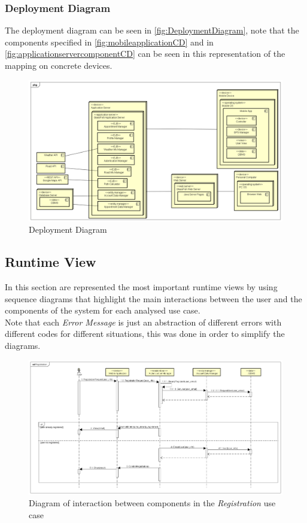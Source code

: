 \begin{samepage}
\subsubsection{Deployment Diagram}
The deployment diagram can be seen in \autoref{fig:DeploymentDiagram}, note that the components specified in \autoref{fig:mobileapplicationCD} and in \autoref{fig:applicationservercomponentCD} can be seen in this representation of the mapping on concrete devices.
\begin{figure}[h]
\centering
\includegraphics[scale=0.40, angle=90]{Img/DeploymentDiagram}
\caption{Deployment Diagram}
\label{fig:DeploymentDiagram}
\end{figure}
\end{samepage}

\clearpage
\subsection{Runtime View}
In this section are represented the most important runtime views by using sequence diagrams that highlight the main interactions between the user and the components of the system for each analysed use case.\\
Note that each \emph{Error Message} is just an abstraction of different errors with different codes for different situations, this was done in order to simplify the diagrams.

\begin{figure}
\centering
\includegraphics[width = \textwidth, keepaspectratio = true, angle=90]{Img/RegistrationSQ}
\caption{Diagram of interaction between components in the \emph{Registration} use case}
\label{fig:RegistrationSQ}
\end{figure}


